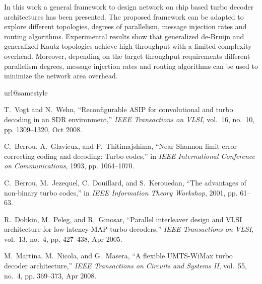 \documentclass[10pt,twocolumn,journal]{IEEEtran}
\begin{document}
In this work a general framework to design network on chip based turbo decoder architectures 
has been presented. The proposed framework can be adapted to explore different topologies,
degrees of parallelism, message injection rates and routing algorithms. Experimental results 
show that generalized de-Bruijn and generalized Kautz topologies achieve high throughput with a 
limited complexity overhead. Moreover, depending on the target throughput requirements different 
parallelism degrees, message injection rates and routing algorithms can be used to minimize the network 
area overhead. 

\begin{thebibliography}{10}
\providecommand{\url}[1]{#1}
\csname url@samestyle\endcsname
\providecommand{\newblock}{\relax}
\providecommand{\bibinfo}[2]{#2}
\providecommand{\BIBentrySTDinterwordspacing}{\spaceskip=0pt\relax}
\providecommand{\BIBentryALTinterwordstretchfactor}{4}
\providecommand{\BIBentryALTinterwordspacing}{\spaceskip=\fontdimen2\font plus
\BIBentryALTinterwordstretchfactor\fontdimen3\font minus
  \fontdimen4\font\relax}
\providecommand{\BIBforeignlanguage}[2]{{\expandafter\ifx\csname l@#1\endcsname\relax
\typeout{** WARNING: IEEEtran.bst: No hyphenation pattern has been}\typeout{** loaded for the language `#1'. Using the pattern for}\typeout{** the default language instead.}\else
\language=\csname l@#1\endcsname
\fi
#2}}
\providecommand{\BIBdecl}{\relax}
\BIBdecl

T.~Vogt and N.~Wehn, ``Reconfigurable {ASIP} for convolutional and turbo
  decoding in an {SDR} environment,'' \emph{IEEE Transactions on VLSI},
  vol.~16, no.~10, pp. 1309--1320, Oct 2008.

C.~Berrou, A.~Glavieux, and P.~Thitimajshima, ``Near {S}hannon limit error
  correcting coding and decoding: {T}urbo codes,'' in \emph{IEEE International
  Conference on Communications}, 1993, pp. 1064--1070.

C.~Berrou, M.~Jezequel, C.~Douillard, and S.~Kerouedan, ``The advantages of
  non-binary turbo codes,'' in \emph{IEEE Information Theory Workshop}, 2001,
  pp. 61--63.

R.~Dobkin, M.~Peleg, and R.~Ginosar, ``Parallel interleaver design and {VLSI}
  architecture for low-latency {MAP} turbo decoders,'' \emph{IEEE Transactions
  on VLSI}, vol.~13, no.~4, pp. 427--438, Apr 2005.

M.~Martina, M.~Nicola, and G.~Masera, ``A flexible {UMTS-WiMax} turbo decoder
  architecture,'' \emph{IEEE Transactions on Circuits and Systems II}, vol.~55,
  no.~4, pp. 369--373, Apr 2008.


\end{thebibliography}
\end{document}

